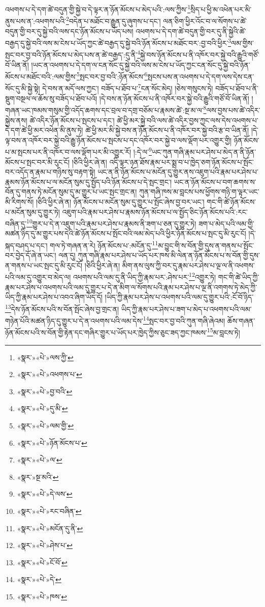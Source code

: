 འཕགས་པ་དེ་དག་ཚེ་བདུན་གྱི་སྐྱེ་བ་དེ་ལྟར་ན་ཉོན་མོངས་པ་མེད་པའི་:ལས་ཀྱིས་\footnote{«སྣར་»«པེ་»ལས་ཀྱི་}སྲིད་པ་ཕྱི་མ་འཕེན་པར་མི་ནུས་པས་ན་:འཕགས་པའི་\footnote{«སྣར་»«པེ་»འཕགས་པ་}བདེན་པ་མཐོང་བ་རྒྱུན་དུ་ཞུགས་པ་དང་། ལན་ཅིག་ཕྱིར་འོང་བ་ལ་སོགས་པ་ཚེ་བདུན་གྱི་བར་དུ་སྐྱེ་བའི་ལས་དང་ཉོན་མོངས་པ་ཡོད་པས། འཕགས་པ་དེ་དག་ཚེ་བདུན་གྱི་བར་དུ་ནི་སྐྱེའི་ཚེ་བརྒྱད་དུ་སྐྱེ་བའི་ལས་མ་ངེས་པ་ཡོད་ཀྱང་ཚེ་བརྒྱད་དུ་སྐྱེ་བའི་ཉོན་མོངས་པ་མཐོང་བར་:བྱ་བའི་ཕྱིར་\footnote{«སྣར་»«པེ་»བྱ་བའི་}ལམ་གྱིས་སྤང་བར་བྱ་བའི་ཉོན་མོངས་པ་མེད་པས་ན་ཚེ་བརྒྱད་:དུ་ནི་\footnote{«སྣར་»«པེ་»དུ་མི་}སྐྱེ་བས་ཉོན་མོངས་པ་ནི་འཁོར་བར་སྐྱེ་བའི་རྒྱུའི་གཙོ་བོ་ཡིན་ནོ། །ཡང་ན་འཕགས་པ་དེ་དག་ལ་ངན་སོང་དུ་སྐྱེ་བའི་ལས་མ་ངེས་པ་ཡོད་ཀྱང་ངན་སོང་དུ་སྐྱེ་བའི་ཉོན་མོངས་པ་མཐོང་བའི་:ལམ་གྱིས་\footnote{«སྣར་»«པེ་»ལམ་གྱི་}སྤང་བར་བྱ་བའི་:ཉོན་མོངས་\footnote{«སྣར་»«པེ་»ཉོན་མོངས་པ་}སྤངས་པས་ན་འཕགས་པ་དེ་དག་ལས་དེས་ངན་སོང་དུ་མི་སྐྱེ་སྟེ། དེ་བས་ན་མདོ་ལས་ཀྱང་། བཟོད་པ་ཐོབ་པ་\footnote{«སྣར་»«པེ་»ལ་}ངན་སོང་མེད། །ཅེས་གསུངས་ཏེ། བཟོད་པ་ཐོབ་པ་ནི་སྡུག་བསྔལ་ལ་ཆོས་སུ་བཟོད་པ་ཐོབ་པའོ། །དེ་བས་ན་ཉོན་མོངས་པ་ནི་འཁོར་བར་སྐྱེ་བའི་རྒྱུའི་གཙོ་བོ་ཡིན་ནོ། །གཞན་ཡང་ཁམས་གསུམ་གྱི་འདོད་ཆགས་དང་བྲལ་བ་དགྲ་བཅོམ་པ་རྣམས་ཚེ་:སྔ་མ་ལ་\footnote{«སྣར་»སྔ་མའི་}ལས་བྱས་པས་ཚེ་འདིར་སྐྱེས་ནས། ཚེ་འདིར་ཉོན་མོངས་པ་སྤངས་པ་དང་། ཚེ་ཕྱི་མར་སྐྱེ་བའི་ལས་ཚེ་འདིར་བྱས་ཀྱང་ལས་དེས་འཕགས་པ་དེ་དག་ཚེ་ཕྱི་མར་འཕེན་མི་ནུས་ཏེ། ཚེ་ཕྱི་མར་མི་སྐྱེ་བས་ན་ཉོན་མོངས་པ་ནི་འཁོར་བར་སྐྱེ་བའི་རྩ་བ་ཡིན་ནོ། །དེ་ལྟ་བས་ན་འཁོར་བར་སྐྱེ་བའི་རྒྱུ་ཉོན་མོངས་པ་སྤངས་པ་དང་འཁོར་བར་སྐྱེ་བ་ལས་ལྡོག་པར་འགྱུར་གྱི། ཉོན་མོངས་པ་མ་སྤངས་པར་ནི་འཁོར་བ་ལས་ལྡོག་པར་མི་འགྱུར་རོ། །:དེ་ལ་\footnote{«སྣར་»«པེ་»དེ་ལས་}ཡང་ཀུན་གཞི་རྣམ་པར་ཤེས་པ་མེད་ན་ནི་ཉོན་མོངས་པ་སྤང་བར་མི་རུང་ངོ། །ཅིའི་ཕྱིར་ཞེ་ན། འདི་ལྟར་ཉན་ཐོས་རྣམ་པར་སྨྲ་བ་པ་ཁྱེད་ཅག་ཉོན་མོངས་པ་སྤོང་བར་འདོད་ན་རྣམ་པ་གཉིས་སུ་བརྟག་སྟེ། ཡང་ན་ནི་ཉོན་མོངས་པ་མངོན་དུ་གྱུར་ནས་འཇུག་པའི་རྣམ་པར་ཤེས་པ་རྣམས་ཉོན་མོངས་པ་ལ་མངོན་སུམ་དུ་སྤྱོད་པའི་ཉོན་མོངས་པ་དེ་སྤང་གྲང་། ཡང་ན་ཉོན་མོངས་པ་བག་ཆགས་ས་བོན་དུ་གནས་ཏེ་མངོན་སུམ་དུ་མ་གྱུར་པ་ཡང་སྤང་གྲང་ན། ཀུན་གཞི་ཁས་མ་བླངས་པས་ཕྱོགས་གཉི་ག་ལྟར་ཡང་མི་རིགས་སོ། །ཅིའི་ཕྱིར་ཞེ་ན། ཉོན་མོངས་པ་མངོན་སུམ་དུ་གྱུར་པ་སྤོང་ཞེས་བྱ་བར་ཡང་། གང་གི་ཚེ་ཉོན་མོངས་པ་མངོན་སུམ་དུ་གྱུར་ཏེ། འཇུག་པའི་རྣམ་པར་ཤེས་པ་རྣམས་ཉོན་མོངས་པ་ལ་སྤྱོད་ཅིང་ཉོན་མོངས་པའི་:རང་བཞིན་དུ་\footnote{«སྣར་»«པེ་»རང་བཞིན་}གྱུར་པ་དེ་ན་འཇུག་པའི་རྣམ་པར་ཤེས་པ་རྣམས་ནི་ཟག་པ་ཅན་དུ་གྱུར་ཏེ། ཟག་པ་མེད་པའི་ལམ་གྱི་མཚན་ཉིད་དུ་མ་གྱུར་པས་དེའི་ཚེ་ཉོན་མོངས་པ་སྤོང་བའི་ལམ་མེད་པའི་ཕྱིར་ཉོན་མོངས་པ་སྤང་དུ་མི་རུང་ངོ། །དེ་སྐད་བཤད་པ་དང་། གལ་ཏེ་གཞན་ན་རེ། ཉོན་མོངས་པ་:མངོན་དུ་\footnote{«སྣར་»«པེ་»མངོན་དུ་ནི་}མ་བྱུང་གི་ས་བོན་གྱི་དུས་ན་གནས་པ་སྤོང་བར་བྱེད་དོ་ཞེ་ན་ཡང་། ལན་དུ། ཀུན་གཞི་རྣམ་པར་ཤེས་པ་ཡོད་པར་ཁས་མི་ལེན་ན་ཉོན་མོངས་པ་ས་བོན་གྱི་དུས་ན་གནས་པ་ཡང་སྤང་དུ་མི་རུང་ངོ། །ཅིའི་ཕྱིར་ཞེ་ན། མིག་ནས་ལུས་ཀྱི་བར་དུ་རྣམ་པར་ཤེས་པ་ལྔ་ལ་ནི་འཕགས་པའི་ལམ་དུ་འགྱུར་བ་མེད་ལ། འཕགས་པའི་ལམ་དུ་ནི་ཡིད་ཀྱི་རྣམ་པར་:ཤེས་པར་\footnote{«སྣར་»«པེ་»ཤེས་པ་}འགྱུར་ཏེ། གང་གི་ཚེ་ཡིད་ཀྱི་རྣམ་པར་ཤེས་པ་འཕགས་པའི་ལམ་དུ་གྱུར་པ་དེ་ན་མིག་ལ་སོགས་པའི་རྣམ་པར་ཤེས་པ་ལྔ་ནི་འགགས་ཏེ་མེད་ཀྱི་ཡིད་ཀྱི་རྣམ་པར་ཤེས་པ་འབའ་ཞིག་ཡོད་དོ། །ཡིད་ཀྱི་རྣམ་པར་ཤེས་པ་འཕགས་པའི་ལམ་དུ་གྱུར་པའི་:ངོ་བོ་ཉིད་\footnote{«སྣར་»«པེ་»ངོ་བོ་}དེས་ཉོན་མོངས་པའི་ས་བོན་སྤོང་ཞེས་བྱ་གྲང་ན། ཡིད་ཀྱི་རྣམ་པར་ཤེས་པ་ཟག་པ་མེད་པ་འཕགས་པའི་ལམ་གཉེན་པོའི་མཚན་ཉིད་དུ་གྱུར་པ་དེ་ན་འཕགས་པའི་ལམ་དེས་\footnote{«སྣར་»«པེ་»དེ་}སྤང་བར་བྱ་བའི་ཀུན་གཞི་ཞེའམ། ཆོས་གཞན་ཉོན་མོངས་པའི་ས་བོན་གྱི་རྟེན་དང་གཞིར་གྱུར་པ་ཡོད་པར་ཁྱེད་ཀྱིས་ཅུང་ཟད་ཀྱང་ཁམས་\footnote{«སྣར་»«པེ་»ཁས་}མ་བླངས་ཏེ། 